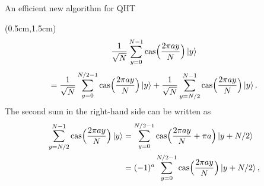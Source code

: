 \documentclass{beamer}
\theoremstyle{definition}
\newcommand{\cas}{\mathrm{cas}}
\begin{document}
\begin{frame}{An efficient new algorithm for QHT}
    
    \begin{textblock*}{12cm}(0.5cm,1.5cm)
        \begin{equation}
            \frac{1}{\sqrt{N}} \sum_{y = 0}^{N - 1} \cas\Big( \frac{2\pi a y}{N} \Big) \ket{y}  
        \end{equation}
        \begin{equation}
            = \frac{1}{\sqrt{N}} \sum_{y = 0}^{N / 2 - 1} \cas\Big( \frac{2\pi a y}{N} \Big) \ket{y} +  \frac{1}{\sqrt{N}} \sum_{y = N / 2}^{N - 1} \cas\Big( \frac{2\pi a y}{N} \Big) \ket{y}.
        \end{equation}
        The second sum in the right-hand side can be written as 
        \begin{align*}
            \sum_{y = N / 2}^{N - 1} \cas\Big( \frac{2\pi a y}{N} \Big) \ket{y}
            & = \sum_{y = 0}^{N / 2 - 1} \cas\Big( \frac{2\pi a y}{N} + \pi a \Big) \ket{y + N/2} \\
            & = (-1)^a \sum_{y = 0}^{N / 2 - 1} \cas\Big( \frac{2\pi a y}{N} \Big) \ket{y + N/2},
        \end{align*}
    \end{textblock*}

\end{frame}
\end{document}
